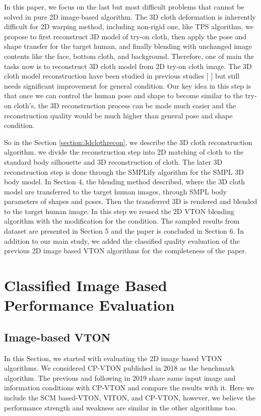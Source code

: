 \documentclass[runningheads]{llncs}
\begin{document}
In this paper, we focus on the last but most difficult problems that cannot be solved in pure 2D image-based algorithm. The 3D cloth deformation is inherently difficult for 2D warping method, including non-rigid one, like TPS algorithm, we propose to first reconstruct 3D model of try-on cloth, then apply the pose and shape transfer for the target human, and finally blending with unchanged image contents like the face, bottom cloth, and background. Therefore, one of main the tasks now is to reconstruct 3D cloth model from 2D try-on cloth image. The 3D cloth model reconstruction have been studied in previous studies [    ] but still needs significant improvement for general condition. Our key idea in this step is that once we can control the human pose and shape to become similar to the try-on cloth's, the 3D reconstruction process can be made much easier and the reconstruction quality would be much higher than general pose and shape condition. 

So in the Section \ref{section:3dclothrecon}, we describe the 3D cloth reconstruction algorithm. we divide the reconstruction step into 2D matching of cloth to the standard body silhouette and 3D reconstruction of cloth. The later 3D reconstruction step is done through the SMPLify\cite{Bogo2016SMPLify} algorithm for the SMPL 3D body model\cite{Loper2015SMPLAS}.  In Section 4, the blending method described, where the 3D cloth model are transferred to the target human images, through SMPL body parameters of shapes and poses. Then the transferred 3D is rendered and blended to the target human image. In this step we reused the 2D VTON blending algorithm with the modification for the condition.  The sampled results from dataset are presented in Section 5 and the paper is concluded in Section 6. In addition to our main study, we added the classified quality evaluation of the previous 2D image based VTON algorithms for the  completeness of the paper.


\section{Classified Image Based Performance Evaluation}

\subsection{Image-based VTON}

In this Section, we started with evaluating the 2D image based VTON algorithms. We considered CP-VTON\cite{Wang2018TowardCI} published in 2018 as the benchmark algorithm. The previous and following in 2019 share same input image and information conditions with CP-VTON and compare the results with it. Here we include the SCM based-VTON, VITON\cite{Han2017VITONAI}, and  CP-VTON\cite{Wang2018TowardCI}, however, we believe the performance strength and weakness are similar in the other algorithms too.
\end{document}
